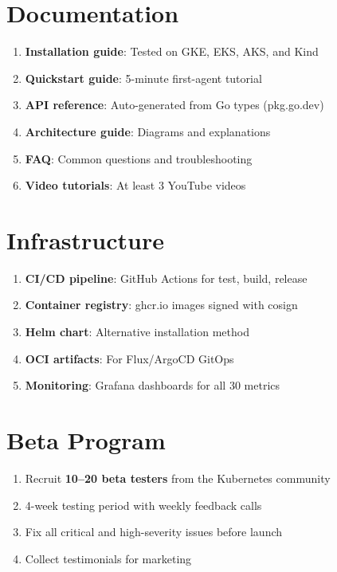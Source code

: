 \documentclass[12pt,a4paper,openany]{report}
\begin{document}
\section{Documentation}

\begin{enumerate}
    \item \textbf{Installation guide}: Tested on GKE, EKS, AKS, and Kind
    \item \textbf{Quickstart guide}: 5-minute first-agent tutorial
    \item \textbf{API reference}: Auto-generated from Go types (pkg.go.dev)
    \item \textbf{Architecture guide}: Diagrams and explanations
    \item \textbf{FAQ}: Common questions and troubleshooting
    \item \textbf{Video tutorials}: At least 3 YouTube videos
\end{enumerate}

\section{Infrastructure}

\begin{enumerate}
    \item \textbf{CI/CD pipeline}: GitHub Actions for test, build, release
    \item \textbf{Container registry}: ghcr.io images signed with cosign
    \item \textbf{Helm chart}: Alternative installation method
    \item \textbf{OCI artifacts}: For Flux/ArgoCD GitOps
    \item \textbf{Monitoring}: Grafana dashboards for all 30 metrics
\end{enumerate}

\section{Beta Program}

\begin{enumerate}
    \item Recruit \textbf{10--20 beta testers} from the Kubernetes community
    \item 4-week testing period with weekly feedback calls
    \item Fix all critical and high-severity issues before launch
    \item Collect testimonials for marketing
\end{enumerate}
\end{document}
